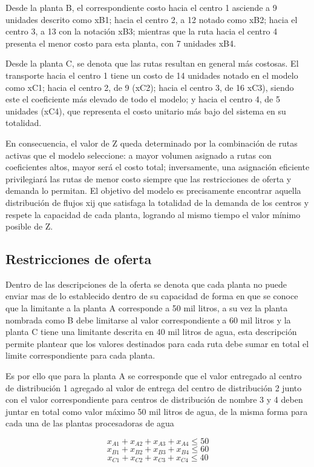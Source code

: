 \documentclass{article}
\begin{document}
	Desde la planta B, el correspondiente costo hacia el centro 1 asciende a 9 unidades descrito como xB1; hacia el centro 2, a 12 notado como xB2; hacia el centro 3, a 13 con la notación xB3; mientras que la ruta hacia el centro 4 presenta el menor costo para esta planta, con 7 unidades xB4.
	
	Desde la planta C, se denota que las rutas resultan en general más costosas. El transporte hacia el centro 1 tiene un costo de 14 unidades notado en el modelo como xC1; hacia el centro 2, de 9 (xC2); hacia el centro 3, de 16 xC3), siendo este el coeficiente más elevado de todo el modelo; y hacia el centro 4, de 5 unidades (xC4), que representa el costo unitario más bajo del sistema en su totalidad.
	
	En consecuencia, el valor de Z queda determinado por la combinación de rutas activas que el modelo seleccione: a mayor volumen asignado a rutas con coeficientes altos, mayor será el costo total; inversamente, una asignación eficiente privilegiará las rutas de menor costo siempre que las restricciones de oferta y demanda lo permitan. El objetivo del modelo es precisamente encontrar aquella distribución de flujos xij que satisfaga la totalidad de la demanda de los centros y respete la capacidad de cada planta, logrando al mismo tiempo el valor mínimo posible de Z.
	
	
	\subsection{Restricciones de oferta}
	Dentro de las descripciones de la oferta se denota que cada planta no puede enviar mas de lo establecido dentro de su capacidad de forma en que se conoce que la limitante a la planta A corresponde a 50 mil litros, a su vez la planta nombrada como B debe limitarse al valor correspondiente a 60 mil litros y la planta C tiene una limitante descrita en 40 mil litros de agua, esta descripción permite plantear que los valores destinados para cada ruta debe sumar en total el limite correspondiente para cada planta.
	
	Es por ello que para la planta A se corresponde que el valor entregado al centro de distribución 1 agregado al valor de entrega del centro de distribución 2 junto con el valor correspondiente para centros de distribución de nombre 3 y 4 deben juntar en total como valor máximo 50 mil litros de agua, de la misma forma para cada una de las plantas procesadoras de agua
	
	\[
	x_{A1} + x_{A2} + x_{A3} + x_{A4} \leq 50
	\]
	\[
	x_{B1} + x_{B2} + x_{B3} + x_{B4} \leq 60
	\]
	\[
	x_{C1} + x_{C2} + x_{C3} + x_{C4} \leq 40
	\]
	
\end{document}
